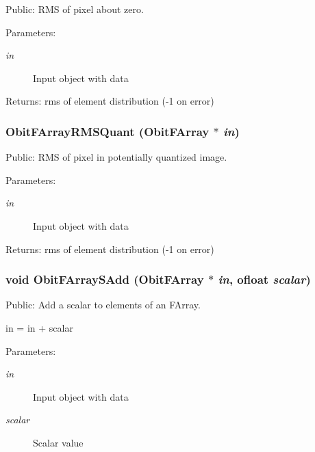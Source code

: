 Public: RMS of pixel about zero. 

\begin{Desc}
\item[Parameters:]
\begin{description}
\item[{\em in}]Input object with data \end{description}
\end{Desc}
\begin{Desc}
\item[Returns:]rms of element distribution (-1 on error) \end{Desc}
\subsubsection{ Obit\-FArray\-RMSQuant ({\bf Obit\-FArray} $\ast$ {\em in})}\label{ObitFArray_8h_a72}


Public: RMS of pixel in potentially quantized image. 

\begin{Desc}
\item[Parameters:]
\begin{description}
\item[{\em in}]Input object with data \end{description}
\end{Desc}
\begin{Desc}
\item[Returns:]rms of element distribution (-1 on error) \end{Desc}
\subsubsection{\setlength{\rightskip}{0pt plus 5cm}void Obit\-FArray\-SAdd ({\bf Obit\-FArray} $\ast$ {\em in}, {\bf ofloat} {\em scalar})}\label{ObitFArray_8h_a83}


Public: Add a scalar to elements of an FArray. 

in = in + scalar \begin{Desc}
\item[Parameters:]
\begin{description}
\item[{\em in}]Input object with data \item[{\em scalar}]Scalar value \end{description}
\end{Desc}
